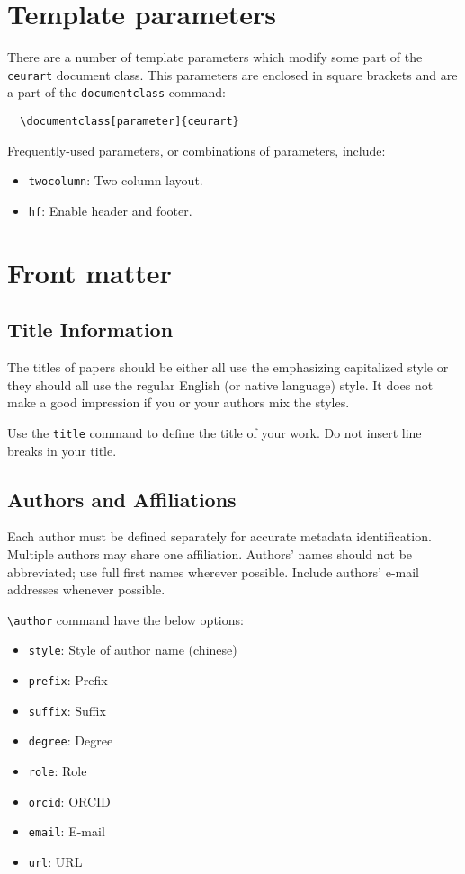 \documentclass[
]{ceurart}
\begin{document}
\section{Template parameters}

There are a number of template
parameters which modify some part of the \verb|ceurart| document class.
This parameters are enclosed in square
brackets and are a part of the {\verb|documentclass|} command:
\begin{verbatim}
  \documentclass[parameter]{ceurart}
\end{verbatim}

Frequently-used parameters, or combinations of parameters, include:
\begin{itemize}
\item {\verb|twocolumn|}: Two column layout.
\item {\verb|hf|}: Enable header and footer.
\end{itemize}

\section{Front matter}

\subsection{Title Information}

The titles of papers should be either all use the emphasizing
capitalized style or they should all use the regular English (or
native language) style. It does not make a good impression if you or
your authors mix the styles.

Use the \verb|title| command to define the title of your work. Do not
insert line breaks in your title.

\subsection{Authors and Affiliations}

Each author must be defined separately for accurate metadata
identification. Multiple authors may share one affiliation. Authors'
names should not be abbreviated; use full first names wherever
possible. Include authors' e-mail addresses whenever possible.

\verb|\author| command have the below options: 

\begin{itemize}
\item \verb|style|: Style of author name (chinese)
\item \verb|prefix|: Prefix
\item \verb|suffix|: Suffix
\item \verb|degree|: Degree
\item \verb|role|: Role
\item \verb|orcid|: ORCID
\item \verb|email|: E-mail
\item \verb|url|: URL
\end{itemize}
\end{document}
